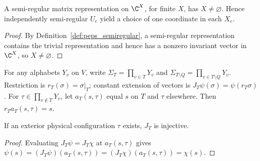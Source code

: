 \begin{lemma}%
    \label{thm:peps_semiregular_alphabet_nonempty}
    \leanok
    A semi-regular matrix representation on $\C^X$, for finite $X$,
    has $X\ne\varnothing$. Hence independently semi-regular $U_e$
    yield a choice of one coordinate in each $X_e$.
\end{lemma}
\begin{proof}\leanok
    By Definition~\ref{def:peps_semiregular}, a semi-regular representation
    contains the trivial representation and hence has a nonzero invariant
    vector in $\C^X$, so $X\ne\varnothing$.
\end{proof}

\begin{definition}%
    \label{def:peps_three_core_physical_coordinates}
    \leanok
    For any alphabets $Y_v$ on $V$, write
    $\Sigma_T=\prod_{v\in T}Y_v$ and
    $\Sigma_{T\setminus Q}=\prod_{v\in T\setminus Q}Y_v$.
    Restriction is $r_T(\sigma)=\sigma|_T$; constant extension of vectors is
    $J_T\psi(\sigma)=\psi(r_T\sigma)$.
    For $\tau\in\prod_{v\notin T}Y_v$, let $a_T(s,\tau)$ equal $s$
    on $T$ and $\tau$ elsewhere. Then $r_Ta_T(s,\tau)=s$.
\end{definition}

\begin{lemma}%
    \label{thm:peps_three_core_extension_injective}
    \leanok
    If an exterior physical configuration $\tau$ exists, $J_T$ is injective.
\end{lemma}
\begin{proof}\leanok
    Evaluating $J_T\psi=J_T\chi$ at $a_T(s,\tau)$ gives
    $\psi(s)=(J_T\psi)(a_T(s,\tau))=(J_T\chi)(a_T(s,\tau))=\chi(s)$.
\end{proof}

